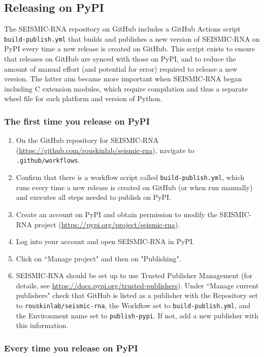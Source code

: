 \documentclass[main.tex]{subfiles}
\begin{document}
\subsection{Releasing on PyPI}

The SEISMIC-RNA repository on GitHub includes a GitHub Actions script \verb|build-publish.yml| that builds and publishes a new version of SEISMIC-RNA on PyPI every time a new release is created on GitHub. This script exists to ensure that releases on GitHub are synced with those on PyPI, and to reduce the amount of manual effort (and potential for error) required to release a new version. The latter aim became more important when SEISMIC-RNA began including C extension modules, which require compilation and thus a separate wheel file for each platform and version of Python.

\subsubsection{The first time you release on PyPI}

\begin{enumerate}
    \item On the GitHub repository for SEISMIC-RNA (\url{https://github.com/rouskinlab/seismic-rna}), navigate to \verb|.github/workflows|.
    \item Confirm that there is a workflow script called \verb|build-publish.yml|, which runs every time a new release is created on GitHub (or when run manually) and executes all steps needed to publish on PyPI.
    \item Create an account on PyPI and obtain permission to modify the SEISMIC-RNA project (\url{https://pypi.org/project/seismic-rna}).
    \item Log into your account and open SEISMIC-RNA in PyPI.
    \item Click on ``Manage project" and then on "Publishing".
    \item SEISMIC-RNA should be set up to use Trusted Publisher Management (for details, see \url{https://docs.pypi.org/trusted-publishers}). Under ``Manage current publishers" check that GitHub is listed as a publisher with the Repository set to \verb|rouskinlab/seismic-rna|, the Workflow set to \verb|build-publish.yml|, and the Environment name set to \verb|publish-pypi|. If not, add a new publisher with this information.
\end{enumerate}


\subsubsection{Every time you release on PyPI}
\end{document}
